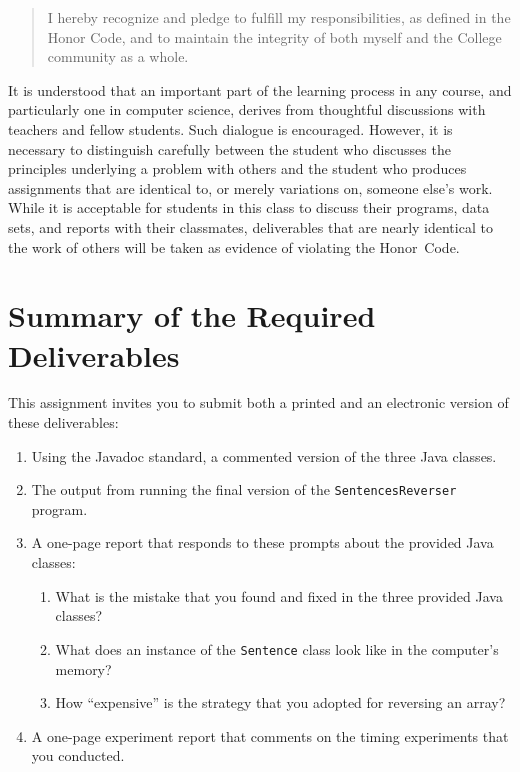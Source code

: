 \vspace*{-.05in}
\begin{quote}
  I hereby recognize and pledge to fulfill my responsibilities, as defined in the Honor Code, and to maintain the
  integrity of both myself and the College community as a whole.
\end{quote}
\vspace*{-.05in}

\noindent It is understood that an important part of the learning process in any course, and particularly one in
computer science, derives from thoughtful discussions with teachers and fellow students.  Such dialogue is encouraged.
However, it is necessary to distinguish carefully between the student who discusses the principles underlying a problem
with others and the student who produces assignments that are identical to, or merely variations on, someone else's
work.  While it is acceptable for students in this class to discuss their programs, data sets, and reports with their
classmates, deliverables that are nearly identical to the work of others will be taken as evidence of violating the
\mbox{Honor Code}.

\section*{Summary of the Required Deliverables}

This assignment invites you to submit both a printed and an electronic version of these deliverables:

\vspace*{-.05in}
\begin{enumerate}

  \itemsep 0em
  \item Using the Javadoc standard, a commented version of the three Java classes.

  \item The output from running the final version of the {\tt SentencesReverser} program.

  \item A one-page report that responds to these prompts about the provided Java classes:

    \vspace*{-.05in}
    \begin{enumerate}
      \itemsep 0em

      \item What is the mistake that you found and fixed in the three provided Java classes?

      \item What does an instance of the {\tt Sentence} class look like in the computer's memory?

      \item How ``expensive'' is the strategy that you adopted for reversing an array?

    \end{enumerate}

  \item A one-page experiment report that comments on the timing experiments that you conducted.

\end{enumerate}

